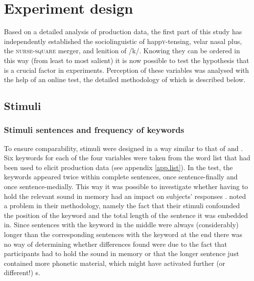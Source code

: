 \chapter{Experiment design}
\label{ch.perc_method}

Based on a detailed analysis of production data, the first part of this study has independently established the sociolinguistic  of happ\textsc{y}-tensing, velar nasal plus, the \textsc{nurse}-\textsc{square} merger, and lenition of /k/.
Knowing they can be ordered in this way (from least to most salient) it is now possible to test the hypothesis that  is a crucial factor in   experiments.
Perception of these variables was analysed with the help of an online test, the detailed methodology of which is described below.

\section{Stimuli}\label{sec.perc_method.stimuli}
\subsection{Stimuli sentences and frequency of keywords}
\label{sec.perc_method.sentences}

To ensure comparability, stimuli were designed in a way similar to that of \citealt{hayetal2006a} and \citealt{niedzielski1999}.
Six keywords for each of the four variables were taken from the word list that had been used to elicit production data (see appendix \ref{app.list}).
In the test, the keywords appeared twice within complete sentences, once sentence-finally and once sentence-medially.
This way it was possible to investigate whether having to hold the relevant sound in memory had an impact on subjects' responses \citep[cf.][]{hayetal2006a}.
\citet{hayetal2006a} noted a problem in their methodology, namely the fact that their stimuli confounded the position of the keyword and the total length of the sentence it was embedded in.
Since sentences with the keyword in the middle were always (considerably) longer than the corresponding sentences with the keyword at the end there was no way of determining whether differences found were due to the fact that participants had to hold the sound in memory or that the longer sentence just contained more phonetic material, which might have activated further (or different!) s.

